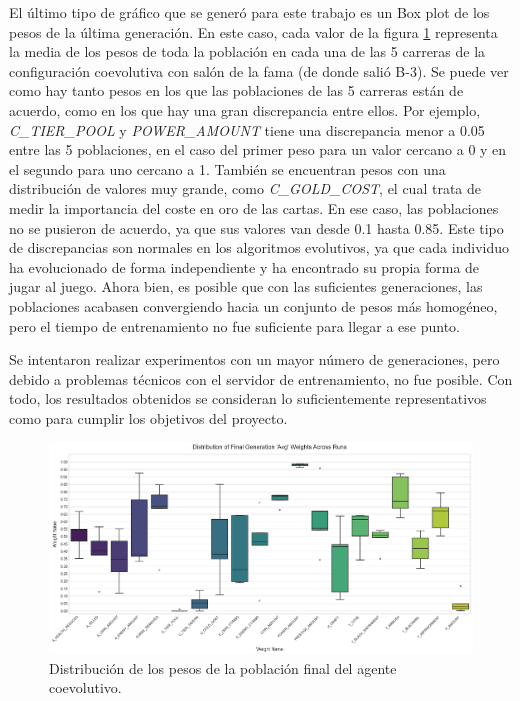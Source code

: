 El último tipo de gráfico que se generó para este trabajo es un Box plot de los pesos de la última generación. En este caso, cada valor de la figura \ref{fig:coevo_final_weights_avg} representa la media de los pesos de toda la población en cada una de las 5 carreras de la configuración coevolutiva con salón de la fama (de donde salió B-3). Se puede ver como hay tanto pesos en los que las poblaciones de las 5 carreras están de acuerdo, como en los que hay una gran discrepancia entre ellos. Por ejemplo, \textit{C\_TIER\_POOL} y \textit{POWER\_AMOUNT} tiene una discrepancia menor a 0.05 entre las 5 poblaciones, en el caso del primer peso para un valor cercano a 0 y en el segundo para uno cercano a 1. También se encuentran pesos con una distribución de valores muy grande, como \textit{C\_GOLD\_COST}, el cual trata de medir la importancia del coste en oro de las cartas. En ese caso, las poblaciones no se pusieron de acuerdo, ya que sus valores van desde 0.1 hasta 0.85. Este tipo de discrepancias son normales en los algoritmos evolutivos, ya que cada individuo ha evolucionado de forma independiente y ha encontrado su propia forma de jugar al juego. Ahora bien, es posible que con las suficientes generaciones, las poblaciones acabasen convergiendo hacia un conjunto de pesos más homogéneo, pero el tiempo de entrenamiento no fue suficiente para llegar a ese punto.

Se intentaron realizar experimentos con un mayor número de generaciones, pero debido a problemas técnicos con el servidor de entrenamiento, no fue posible. Con todo, los resultados obtenidos se consideran lo suficientemente representativos como para cumplir los objetivos del proyecto.

\begin{figure}[H]
	\centering
	\includegraphics[width=1.0\textwidth]{img/coevo_final_weights_avg.png}
	\caption{Distribución de los pesos de la población final del agente coevolutivo.}
	\label{fig:coevo_final_weights_avg}
\end{figure}

